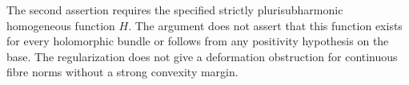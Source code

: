 The second assertion requires the specified strictly plurisubharmonic homogeneous function $H$. The argument does not assert that this function exists for every holomorphic bundle or follows from any positivity hypothesis on the base. The regularization does not give a deformation obstruction for continuous fibre norms without a strong convexity margin.
